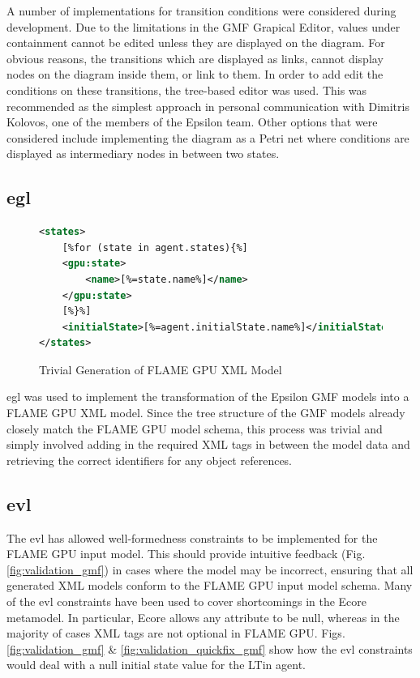 \documentclass{UoYCSproject}
\begin{document}
A number of implementations for transition conditions were considered during development.
Due to the limitations in the GMF Grapical Editor, values under containment cannot be edited unless they are displayed on the diagram.
For obvious reasons, the transitions which are displayed as links, cannot display nodes on the diagram inside them, or link to them.
In order to add edit the conditions on these transitions, the tree-based editor was used.
This was recommended as the simplest approach in personal communication with Dimitris Kolovos, one of the members of the Epsilon team.
Other options that were considered include implementing the diagram as a Petri net where conditions are displayed as intermediary nodes in between two states.

\subsection{\acrfull{egl}}
\begin{figure}
\centering
\begin{lstlisting}[language=XML, basicstyle=\tiny]
<states>
    [%for (state in agent.states){%]
    <gpu:state>
        <name>[%=state.name%]</name>
    </gpu:state>
    [%}%]
    <initialState>[%=agent.initialState.name%]</initialState>
</states>
\end{lstlisting}
\caption{Trivial Generation of \gls{FLAME GPU} XML Model}
\label{fig:egl_example}
\end{figure}

\gls{egl} was used to implement the transformation of the Epsilon GMF models into a \gls{FLAME GPU} XML model.
Since the tree structure of the GMF models already closely match the \gls{FLAME GPU} model schema, this process was trivial and simply involved adding in the required XML tags in between the model data and retrieving the correct identifiers for any object references.

\subsection{\acrfull{evl}}
The \gls{evl} has allowed well-formedness constraints to be implemented for the \gls{FLAME GPU} input model.
This should provide intuitive feedback (Fig. \ref{fig:validation_gmf}) in cases where the model may be incorrect, ensuring that all generated XML models conform to the \gls{FLAME GPU} input model schema.
Many of the \gls{evl} constraints have been used to cover shortcomings in the Ecore metamodel.
In particular, Ecore allows any attribute to be null, whereas in the majority of cases XML tags are not optional in \gls{FLAME GPU}.
Figs. \ref{fig:validation_gmf} \& \ref{fig:validation_quickfix_gmf} show how the \gls{evl} constraints would deal with a null initial state value for the \gls{LTin} agent.
\end{document}
